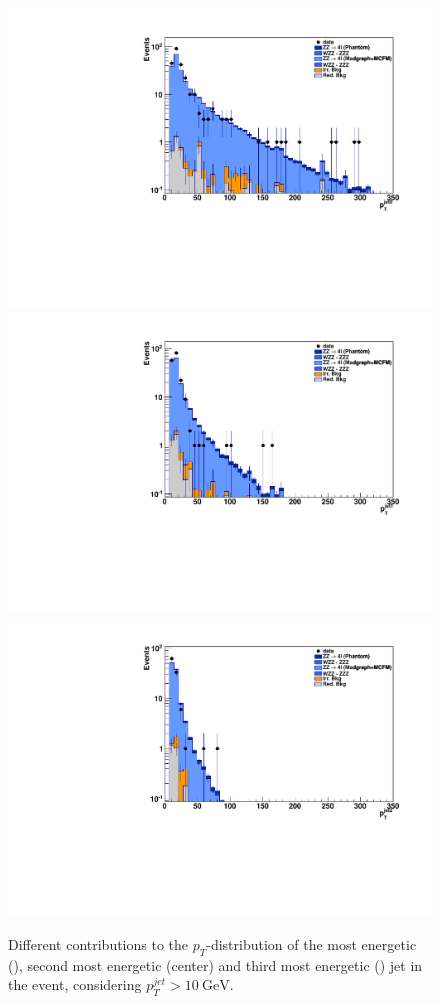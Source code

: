 \begin{figure}[hbtp]
  \begin{center}
   \includegraphics[width=0.8\cmsFigWidth]{Figures/Pt0_mad_log}    
   \includegraphics[width=0.8\cmsFigWidth]{Figures/Pt1_mad_log}
   \includegraphics[width=0.8\cmsFigWidth]{Figures/Pt2_mad_log}
   \caption{Different contributions to the $p_{T}$-distribution of the most energetic (\cmsLeft), second most energetic (center) and third most energetic (\cmsRight) jet in the event, considering  $p_T^{jet}> 10~\mathrm{GeV}$.}
   \label{fig:pt_jets}
  \end{center}
\end{figure}

